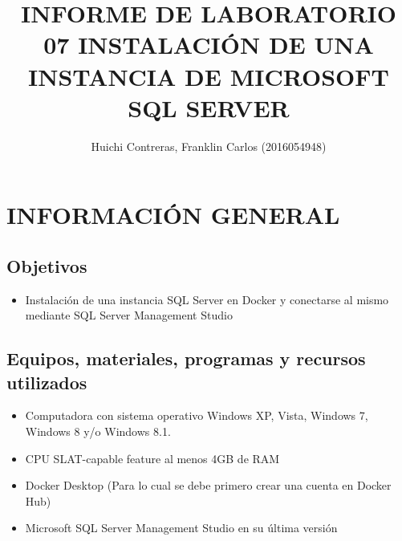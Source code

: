 \documentclass[preprint,12pt]{elsarticle}
\begin{document}
	
	\begin{frontmatter} 

		\title{\huge INFORME DE LABORATORIO 07 INSTALACIÓN DE UNA INSTANCIA DE MICROSOFT SQL SERVER}
		
		\author{Huichi Contreras, Franklin Carlos         	(2016054948)} 
		\address{Escuela Profesional de Ingeniería de Sistemas}
		\address{Universidad Privada de Tacna}
		\address{Tacna, Perú}
		

	\end{frontmatter}


\section{INFORMACIÓN GENERAL} 

\subsection {\textbf{Objetivos}}
\begin{itemize}
	\item Instalación de una instancia SQL Server en Docker y conectarse al mismo mediante SQL Server Management Studio
\end{itemize}

\subsection {\textbf{Equipos, materiales, programas y recursos utilizados}}
\begin{itemize}
	\item Computadora con sistema operativo Windows XP, Vista, Windows 7, Windows 8 y/o Windows 8.1.
	\item CPU SLAT-capable feature al menos 4GB de RAM
	\item Docker Desktop (Para lo cual se debe primero crear una cuenta en Docker Hub)
	\item Microsoft SQL Server Management Studio en su última versión
\end{itemize}



\end{document}
